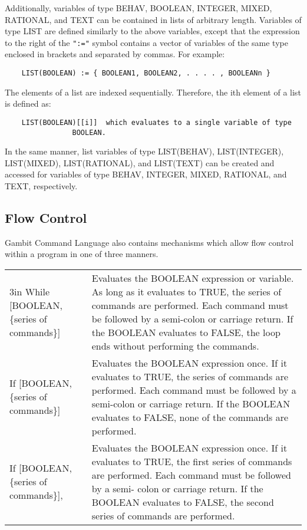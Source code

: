 \medskip

\noindent
Additionally, variables of type  BEHAV, BOOLEAN, INTEGER, MIXED, RATIONAL, and 
TEXT can be contained in lists of arbitrary length.  Variables of type LIST are
defined similarly to the above variables, except that the expression to the 
right of the {\tt ":="} symbol contains a vector of variables of the same 
type enclosed in brackets and separated by commas.  For example:

\begin{verbatim}
	LIST(BOOLEAN) := { BOOLEAN1, BOOLEAN2, . . . . , BOOLEANn }
\end{verbatim}

The elements of a list are indexed sequentially.  Therefore, the ith element of
a list is defined as:

\begin{verbatim}
	LIST(BOOLEAN)[[i]]	which evaluates to a single variable of type 
				BOOLEAN.
\end{verbatim}

\noindent
In the same manner, list variables of type LIST(BEHAV), LIST(INTEGER), 
LIST(MIXED), LIST(RATIONAL), and LIST(TEXT) can be created and accessed for 
variables of type BEHAV, INTEGER, MIXED, RATIONAL, and TEXT, respectively.

\subsection*{Flow Control}

Gambit Command Language also contains mechanisms which allow flow control 
within a program in one of three manners.

\medskip

\begin{tabular}{lp}{3in}
While [BOOLEAN, \{series of commands\}] & Evaluates the BOOLEAN
expression or variable.  As long as it evaluates to TRUE, the series
of commands are performed.  Each command must be followed by a
semi-colon or carriage return.  If the BOOLEAN evaluates to FALSE, the
loop ends without performing the commands.\\
If [BOOLEAN, \{series of commands\}] & Evaluates the BOOLEAN expression
once. If it evaluates to TRUE, the series of commands are performed.
Each command must be followed by a semi-colon or carriage return.  If
the BOOLEAN evaluates to FALSE, none of the commands are performed.\\
If [BOOLEAN, \{series of commands\}], & Evaluates the BOOLEAN expression
once. If it evaluates to TRUE, the first series of commands are
performed.  Each command must be followed by a semi-
colon or carriage return.  If the BOOLEAN evaluates to FALSE, the second
series of commands are performed. \\
\end{tabular}	

